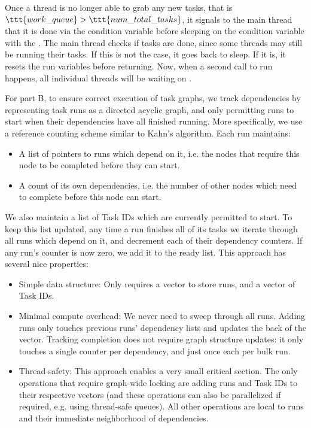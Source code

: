 \documentclass[11pt]{article}
\begin{document}
Once a thread is no longer able to grab any new tasks, that is
$\ttt{work\_queue} > \ttt{num\_total\_tasks}$, it signals to the main thread
that it is done via the  condition variable before sleeping on
the  condition variable with the . The main thread
checks if  tasks are done, since some threads may still be running
their tasks. If this is not the case, it goes back to sleep. If it is, it resets
the run variables before returning. Now, when a second call to run happens, all
individual threads will be waiting on .
% 

\bigskip
For part B, to ensure correct execution of task graphs, we track dependencies by representing task runs as a directed acyclic graph, and only permitting runs to start when their dependencies have all finished running.
More specifically, we use a reference counting scheme similar to Kahn's algorithm. 
Each run maintains: 

\begin{itemize}
    \item A list of pointers to runs which depend on it, i.e. the nodes that require this node to be completed before they can start.
    \item A count of its own dependencies, i.e. the number of other nodes which need to complete before this node can start.
\end{itemize}

We also maintain a list of Task IDs which are currently permitted to start. To
keep this list updated, any time a run finishes all of its tasks we iterate
through all runs which depend on it, and decrement each of their dependency
counters. If any run's counter is now zero, we add it to the ready list. This
approach has several nice properties:

\begin{itemize}
    \item Simple data structure: Only requires a vector to store runs, and a
      vector of Task IDs.
    \item Minimal compute overhead: We never need to sweep through all runs.
      Adding runs only touches previous runs' dependency lists and updates the
      back of the vector. Tracking completion does not require graph structure
      updates: it only touches a single counter per dependency, and just once
      each per bulk run.
    \item Thread-safety: This approach enables a very small critical section.
      The only operations that require graph-wide locking are adding runs and
      Task IDs to their respective vectors (and these operations can also be
      parallelized if required, e.g. using thread-safe queues). All other
      operations are local to runs and their immediate neighborhood of
      dependencies.
\end{itemize}
\end{document}

